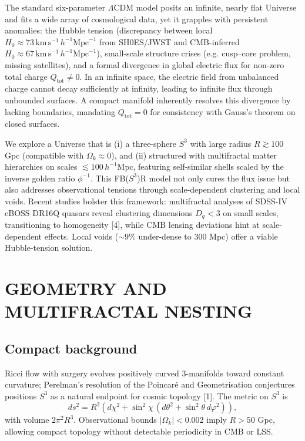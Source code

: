 \documentclass[10pt,twocolumn]{article}
\begin{document}
The standard six-parameter $\Lambda$CDM model posits an infinite, nearly flat Universe and fits a wide array of cosmological data, yet it grapples with persistent anomalies: the Hubble tension (discrepancy between local $H_0 \approx 73\,\mathrm{km}\,\mathrm{s}^{-1}\,h^{-1}\mathrm{Mpc}^{-1}$ from SH0ES/JWST and CMB-inferred $H_0 \approx 67\,\mathrm{km}\,\mathrm{s}^{-1}\,h^{-1}\mathrm{Mpc}^{-1}$), small-scale structure crises (e.g. cusp--core problem, missing satellites), and a formal divergence in global electric flux for non-zero total charge $Q_{\mathrm{tot}} \ne 0$. In an infinite space, the electric field from unbalanced charge cannot decay sufficiently at infinity, leading to infinite flux through unbounded surfaces. A compact manifold inherently resolves this divergence by lacking boundaries, mandating $Q_{\mathrm{tot}}=0$ for consistency with Gauss's theorem on closed surfaces.

We explore a Universe that is (i) a three-sphere $S^3$ with large radius $R\gtrsim100$ Gpc (compatible with $\Omega_k\approx0$), and (ii) structured with multifractal matter hierarchies on scales $\lesssim100\,h^{-1}\mathrm{Mpc}$, featuring self-similar shells scaled by the inverse golden ratio $\phi^{-1}$. This FB($S^3$)R model not only cures the flux issue but also addresses observational tensions through scale-dependent clustering and local voids. Recent studies bolster this framework: multifractal analyses of SDSS-IV eBOSS DR16Q quasars reveal clustering dimensions $D_q<3$ on small scales, transitioning to homogeneity [4], while CMB lensing deviations hint at scale-dependent effects. Local voids ($\sim9\%$ under-dense to 300 Mpc) offer a viable Hubble-tension solution.

\section{GEOMETRY AND MULTIFRACTAL NESTING}

\subsection{Compact background}

Ricci flow with surgery evolves positively curved 3-manifolds toward constant curvature; Perelman's resolution of the Poincar\'e and Geometrisation conjectures positions $S^3$ as a natural endpoint for cosmic topology [1]. The metric on $S^3$ is
\[
ds^2 = R^2\left(d\chi^2 + \sin^2\chi\,(d\theta^2 + \sin^2\theta\,d\varphi^2)\right),
\]
with volume $2\pi^2R^3$. Observational bounds $|\Omega_k|<0.002$ imply $R>50$ Gpc, allowing compact topology without detectable periodicity in CMB or LSS.
\end{document}
